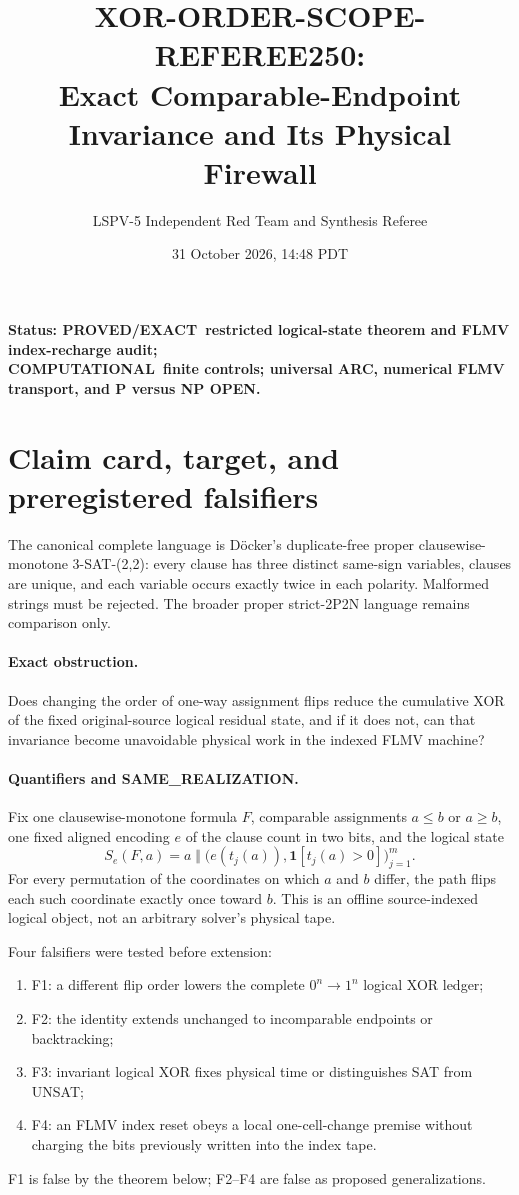\documentclass[11pt]{article}
\title{XOR-ORDER-SCOPE-REFEREE250:\\Exact Comparable-Endpoint Invariance and Its Physical Firewall}
\author{LSPV-5 Independent Red Team and Synthesis Referee}
\date{31 October 2026, 14:48 PDT}
\newcommand{\OPEN}{\textbf{OPEN}}
\newcommand{\EXACT}{\textbf{PROVED/EXACT}}
\newcommand{\COMP}{\textbf{COMPUTATIONAL}}
\begin{document}
\maketitle

\begin{center}
\textbf{Status: \EXACT\ restricted logical-state theorem and FLMV index-recharge audit;\\
\COMP\ finite controls; universal ARC, numerical FLMV transport, and P versus NP \OPEN.}
\end{center}

\section{Claim card, target, and preregistered falsifiers}
The canonical complete language is D\"ocker's duplicate-free proper clausewise-monotone
3-SAT-(2,2): every clause has three distinct same-sign variables, clauses are unique,
and each variable occurs exactly twice in each polarity.  Malformed strings must be
rejected.  The broader proper strict-2P2N language remains comparison only.

\paragraph{Exact obstruction.}
Does changing the order of one-way assignment flips reduce the cumulative XOR of the
fixed original-source logical residual state, and if it does not, can that invariance
become unavoidable physical work in the indexed FLMV machine?

\paragraph{Quantifiers and SAME\_REALIZATION.}
Fix one clausewise-monotone formula $F$, comparable assignments $a\le b$ or $a\ge b$,
one fixed aligned encoding $e$ of the clause count in two bits, and the logical state
\[
 S_e(F,a)=a\;\Vert\;\bigl(e(t_j(a)),\mathbf 1[t_j(a)>0]\bigr)_{j=1}^m.
\]
For every permutation of the coordinates on which $a$ and $b$ differ, the path flips
each such coordinate exactly once toward $b$.  This is an offline source-indexed
logical object, not an arbitrary solver's physical tape.

Four falsifiers were tested before extension:
\begin{enumerate}
\item F1: a different flip order lowers the complete $0^n\to1^n$ logical XOR ledger;
\item F2: the identity extends unchanged to incomparable endpoints or backtracking;
\item F3: invariant logical XOR fixes physical time or distinguishes SAT from UNSAT;
\item F4: an FLMV index reset obeys a local one-cell-change premise without charging
      the bits previously written into the index tape.
\end{enumerate}
F1 is false by the theorem below; F2--F4 are false as proposed generalizations.
\end{document}
